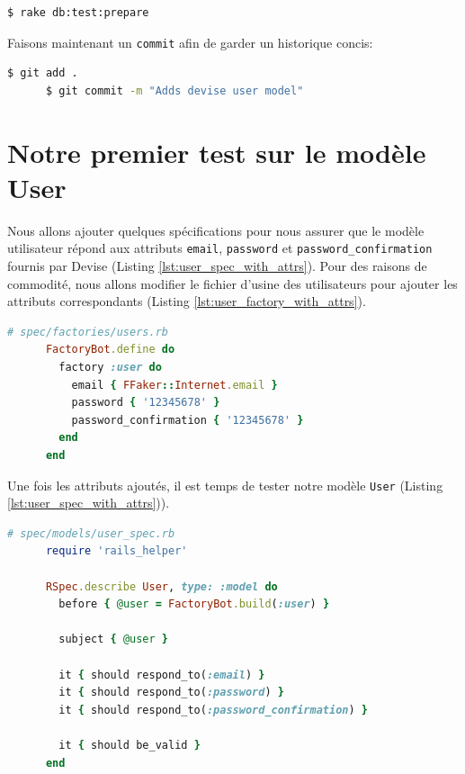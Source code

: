 \documentclass[]{report}
\begin{document}
    \begin{scriptsize}
      \begin{lstlisting}[language=bash]
      $ rake db:test:prepare
      \end{lstlisting}
    \end{scriptsize}

    Faisons maintenant un \verb|commit| afin de garder un historique concis:

    \begin{scriptsize}
      \begin{lstlisting}[language=bash]
      $ git add .
      $ git commit -m "Adds devise user model"
      \end{lstlisting}
    \end{scriptsize}

  \section{Notre premier test sur le modèle User}

    Nous allons ajouter quelques spécifications pour nous assurer que le modèle utilisateur répond aux attributs \verb|email|, \verb|password| et \verb|password_confirmation| fournis par Devise (Listing \ref{lst:user_spec_with_attrs}). Pour des raisons de commodité, nous allons modifier le fichier d'usine des utilisateurs pour ajouter les attributs correspondants (Listing \ref{lst:user_factory_with_attrs}).

    \begin{scriptsize}
      \begin{lstlisting}[language=ruby, caption={Usine d'utilisateurs avec les attributs}, label={lst:user_factory_with_attrs}]
      # spec/factories/users.rb
      FactoryBot.define do
        factory :user do
          email { FFaker::Internet.email }
          password { '12345678' }
          password_confirmation { '12345678' }
        end
      end
      \end{lstlisting}
    \end{scriptsize}

    Une fois les attributs ajoutés, il est temps de tester notre modèle \verb|User| (Listing \ref{lst:user_spec_with_attrs})).

    \begin{scriptsize}
      \begin{lstlisting}[language=ruby, caption={Test pour les attributs Devise}, label={lst:user_spec_with_attrs}]
      # spec/models/user_spec.rb
      require 'rails_helper'

      RSpec.describe User, type: :model do
        before { @user = FactoryBot.build(:user) }

        subject { @user }

        it { should respond_to(:email) }
        it { should respond_to(:password) }
        it { should respond_to(:password_confirmation) }

        it { should be_valid }
      end
      \end{lstlisting}
    \end{scriptsize}
\end{document}
